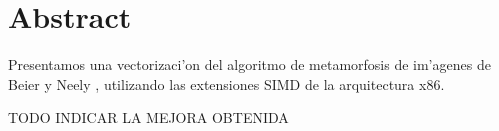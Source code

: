\section{Abstract}

Presentamos una vectorizaci'on del algoritmo de metamorfosis de im'agenes de Beier y Neely \cite{beier92}, utilizando las extensiones SIMD de la arquitectura x86.

TODO INDICAR LA MEJORA OBTENIDA
